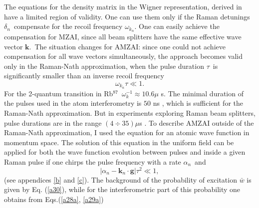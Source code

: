 \documentclass[twocolumn,showpacs,preprintnumbers]{revtex4}
\begin{document}
The equations for the density matrix in the Wigner representation, derived
in \cite{c8} have a limited region of validity. One can use them only if the
Raman detunings $\delta _{n}$\ compensate for the recoil frequency $\omega
_{k_{n}}$. One can easily achieve the compensation for MZAI, since all beam
splitters have the same effective wave vector $\mathbf{k}.$\ The situation
changes for AMZAI: since one could not achieve compensation for all wave
vectors simultaneously, the approach \cite{c8} becomes valid only in the
Raman-Nath approximation, when the pulse duration $\tau $\ is significantly
smaller than an inverse recoil frequency{\LARGE \ }%
\begin{equation}
\omega _{k_{n}}\tau \ll 1.  \label{19}
\end{equation}%
For the 2-quantum transition in Rb$^{87}$\ $\omega _{k}^{-1}\approx 10.6\mu $%
s. The minimal duration of the pulses used in the atom interferometry is $50$%
ns \cite{c21}, which is sufficient for the Raman-Nath approximation. But in
experiments exploring Raman beam splitters, pulse durations are in the range 
$\left( 4\div 35\right) \mu $s \cite%
{c10,c22,c23,c24,c25,c26,c27,c28,c29,c30,c31,c32}. To describe AMZAI outside
of the Raman-Nath approximation, I used the equation for an atomic wave
function in momentum space. The solution of this equation in the uniform
field \cite{c11} can be applied for both the wave function evolution between
pulses and inside a given Raman pulse if one chirps the pulse frequency with
a rate $\alpha _{n}$\ and{\LARGE \ }%
\begin{equation}
\left\vert \alpha _{n}-\mathbf{k}_{n}\cdot \mathbf{g}\right\vert \tau
^{2}\ll 1,  \label{20}
\end{equation}%
(see appendices \ref{b} and \ref{c}). The background of the probability of
excitation $\bar{w}$ is given by Eq. (\ref{a30}), while for the
interferometric part of this probability one obtains from Eqs.(\ref{a28a}, %
\ref{a29a})
\end{document}
